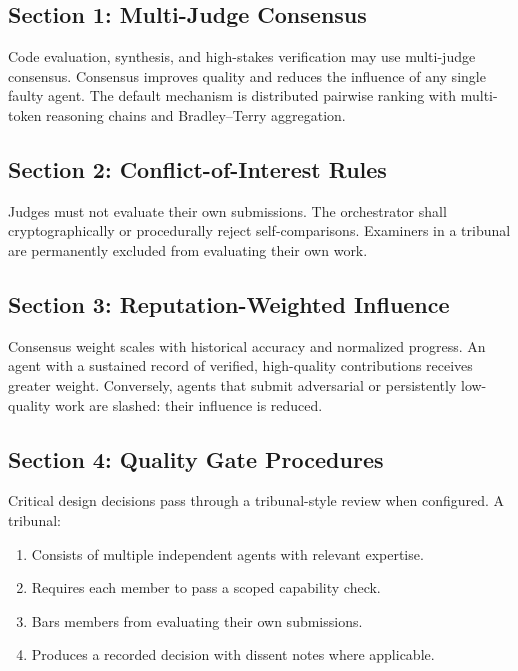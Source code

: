 \documentclass[12pt,letterpaper]{article}
\begin{document}
\subsection{Section 1: Multi-Judge Consensus}

Code evaluation, synthesis, and high-stakes verification may use multi-judge consensus. Consensus improves quality and reduces the influence of any single faulty agent. The default mechanism is distributed pairwise ranking with multi-token reasoning chains and Bradley--Terry aggregation.

\subsection{Section 2: Conflict-of-Interest Rules}

Judges must not evaluate their own submissions. The orchestrator shall cryptographically or procedurally reject self-comparisons. Examiners in a tribunal are permanently excluded from evaluating their own work.

\subsection{Section 3: Reputation-Weighted Influence}

Consensus weight scales with historical accuracy and normalized progress. An agent with a sustained record of verified, high-quality contributions receives greater weight. Conversely, agents that submit adversarial or persistently low-quality work are slashed: their influence is reduced.

\subsection{Section 4: Quality Gate Procedures}

Critical design decisions pass through a tribunal-style review when configured. A tribunal:

\begin{enumerate}
    \item Consists of multiple independent agents with relevant expertise.
    \item Requires each member to pass a scoped capability check.
    \item Bars members from evaluating their own submissions.
    \item Produces a recorded decision with dissent notes where applicable.
\end{enumerate}
\end{document}
